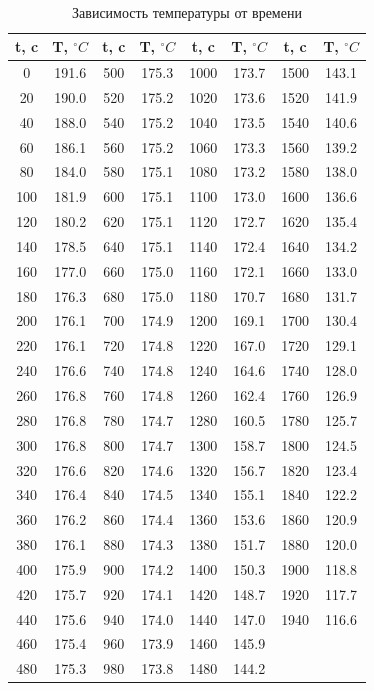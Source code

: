 \documentclass{article}
\begin{document}
\setlength\doublerulesep{0.7pt}
\begin{table}[htb]
	\hypertarget{table}{}\\
	\caption{Зависимость температуры от времени}
	\begin{tabular}{c|c||c|c||c|c||c|c}
		t, c& T, $ ^\circ C $&t, c& T, $ ^\circ C $&t, c& T, $ ^\circ C $&t, c& T, $ ^\circ C $\\
		\hline\hline
		\cellcolor{yellow}0 & \cellcolor{yellow}191.6	&	500	&	175.3	&	1000	&	173.7	&	1500	&	143.1	\\
		20	&	190.0	&	520	&	175.2	&	1020	&	173.6	&	1520	&	141.9	\\
		40	&	188.0	&	540	&	175.2	&	1040	&	173.5	&	1540	&	140.6	\\
		60	&	186.1	&	560	&	175.2	&	1060	&	173.3	&	1560	&	139.2	\\
		80	&	184.0	&	580	&	175.1	&	1080	&	173.2	&	1580	&	138.0	\\
		100	&	181.9	&	600	&	175.1	&	1100	&	173.0	&	1600	&	136.6	\\
		120	&	180.2	&	620	&	175.1	&	1120	&	172.7	&	1620	&	135.4	\\
		140	&	178.5	&	640	&	175.1	&	1140	&	172.4	&	1640	&	134.2	\\
		160	&	177.0	&	660	&	175.0	&	\cellcolor{yellow}1160&	\cellcolor{yellow}172.1	&	1660	&	133.0	\\
		180	&	176.3	&	680	&	175.0	&	1180	&	170.7	&	1680	&	131.7	\\
		\cellcolor{yellow}200&	\cellcolor{yellow}176.1	&	700	&	174.9	&	1200	&	169.1	&	1700	&	130.4	\\
		220	&	176.1	&	720	&	174.8	&	1220	&	167.0	&	1720	&	129.1	\\
		240	&	176.6	&	740	&	174.8	&	1240	&	164.6	&	1740	&	128.0	\\
		260	&	176.8	&	760	&	174.8	&	1260	&	162.4	&	1760	&	126.9	\\
		280	&	176.8	&	780	&	174.7	&	1280	&	160.5	&	1780	&	125.7	\\
		300	&	176.8	&	800	&	174.7	&	1300	&	158.7	&	1800	&	124.5	\\
		320	&	176.6	&	820	&	174.6	&	1320	&	156.7	&	1820	&	123.4	\\
		340	&	176.4	&	840	&	174.5	&	1340	&	155.1	&	1840	&	122.2	\\
		360	&	176.2	&	860	&	174.4	&	1360	&	153.6	&	1860	&	120.9	\\
		380	&	176.1	&	880	&	174.3	&	1380	&	151.7	&	1880	&	120.0	\\
		400	&	175.9	&	900	&	174.2	&	1400	&	150.3	&	1900	&	118.8	\\
		420	&	175.7	&	920	&	174.1	&	1420	&	148.7	&	1920	&	117.7	\\
		440	&	175.6	&	940	&	174.0	&	1440	&	147.0	&	\cellcolor{yellow}1940	&	\cellcolor{yellow}116.6	\\
		460	&	175.4	&	960	&	173.9	&	1460	&	145.9	&		&		\\
		480	&	175.3	&	980	&	173.8	&	1480	&	144.2	&		&	\\
		\hline\hline
	\end{tabular}
\end{table}
\end{document}
